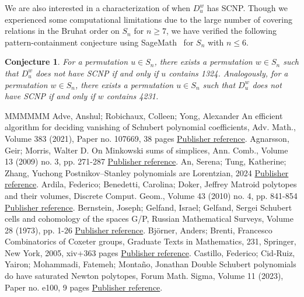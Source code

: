 \documentclass[11pt]{article}
\newtheorem{conjecture}[theo]{Conjecture}
\theoremstyle{definition}
\numberwithin{equation}{section}
\begin{document}
We are also interested in a characterization of when $D_u^w$ has SCNP. Though we experienced some computational limitations due to the large number of covering relations in the Bruhat order on $S_n$ for $n \ge 7$, we have verified the following pattern-containment conjecture using SageMath~\cite{sagemath} for $S_n$ with $n\le 6$.
\begin{conjecture}
    For a permutation $u\in S_n$, there exists a permutation $w\in S_n$ such that $D_{u}^w$ does not have SCNP if and only if $u$ contains 1324. Analogously, for a permutation $w\in S_n$, there exists a permutation $u\in S_n$ such that $D_{u}^w$ does not have SCNP if and only if $w$ contains 4231. 
\end{conjecture}
\begin{thebibliography}{MMMMMM}
 Adve, Anshul; Robichaux, Colleen; Yong, Alexander An efficient algorithm for deciding vanishing of Schubert polynomial coefficients, Adv. Math., Volume 383 (2021), Paper no. 107669, 38 pages \href{https://alco.centre-mersenne.org/articles/10.5802/alco.450/#ARY}{Publisher reference}.
 Agnarsson, Geir; Morris, Walter D. On Minkowski sums of simplices, Ann. Comb., Volume 13 (2009) no. 3, pp. 271-287 \href{https://alco.centre-mersenne.org/articles/10.5802/alco.450/#2009minkowski}{Publisher reference}.
 An, Serena; Tung, Katherine; Zhang, Yuchong Postnikov–Stanley polynomials are Lorentzian, 2024 \href{https://alco.centre-mersenne.org/articles/10.5802/alco.450/#PSLorentzian}{Publisher reference}.
 Ardila, Federico; Benedetti, Carolina; Doker, Jeffrey Matroid polytopes and their volumes, Discrete Comput. Geom., Volume 43 (2010) no. 4, pp. 841-854 \href{https://alco.centre-mersenne.org/articles/10.5802/alco.450/#MatroidPolytopes}{Publisher reference}.
 Bernstein, Joseph; Gelfand, Israel; Gelfand, Sergei Schubert cells and cohomology of the spaces G/P, Russian Mathematical Surveys, Volume 28 (1973), pp. 1-26 \href{https://alco.centre-mersenne.org/articles/10.5802/alco.450/#BGG}{Publisher reference}.
 Björner, Anders; Brenti, Francesco Combinatorics of Coxeter groups, Graduate Texts in Mathematics, 231, Springer, New York, 2005, xiv+363 pages \href{https://alco.centre-mersenne.org/articles/10.5802/alco.450/#BjornerBrenti}{Publisher reference}.
 Castillo, Federico; Cid-Ruiz, Yairon; Mohammadi, Fatemeh; Montaño, Jonathan Double Schubert polynomials do have saturated Newton polytopes, Forum Math. Sigma, Volume 11 (2023), Paper no. e100, 9 pages \href{https://alco.centre-mersenne.org/articles/10.5802/alco.450/#DoubleSchSNP}{Publisher reference}.

\end{thebibliography}
\end{document}
